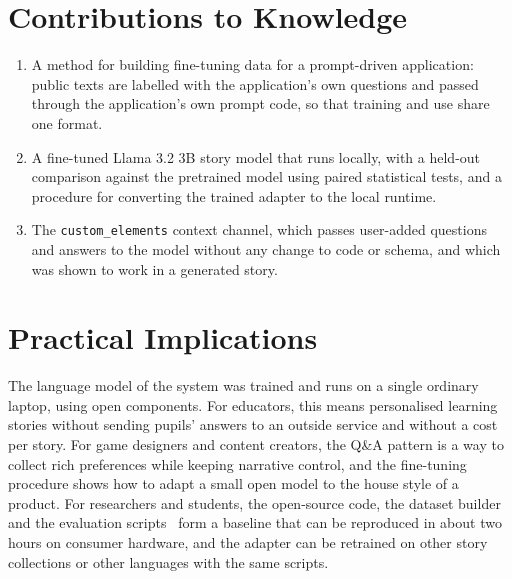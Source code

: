 \section{Contributions to Knowledge}
\label{sec:con-contributions}

\begin{enumerate}
    \item A method for building fine-tuning data for a prompt-driven application: public texts are labelled with the application's own questions and passed through the application's own prompt code, so that training and use share one format.
    \item A fine-tuned Llama 3.2 3B story model that runs locally, with a held-out comparison against the pretrained model using paired statistical tests, and a procedure for converting the trained adapter to the local runtime.
    \item The \texttt{custom\_elements} context channel, which passes user-added questions and answers to the model without any change to code or schema, and which was shown to work in a generated story.
\end{enumerate}

\section{Practical Implications}
\label{sec:con-implications}

The language model of the system was trained and runs on a single ordinary laptop, using open components. For educators, this means personalised learning stories without sending pupils' answers to an outside service and without a cost per story. For game designers and content creators, the Q\&A pattern is a way to collect rich preferences while keeping narrative control, and the fine-tuning procedure shows how to adapt a small open model to the house style of a product. For researchers and students, the open-source code, the dataset builder and the evaluation scripts~\cite{jha2026repo} form a baseline that can be reproduced in about two hours on consumer hardware, and the adapter can be retrained on other story collections or other languages with the same scripts.
